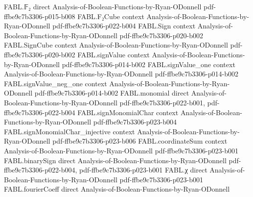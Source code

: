 \begin{theorem}
\label{FABL.averageComplexity_orFunction_eq}
\leanok
{}
\proofstep
  {FABL.𝔽₂}
  {direct}
  {Analysis-of-Boolean-Functions-by-Ryan-ODonnell}
  {pdf-ffbe9c7b3306-p015-b008}
\proofstep
  {FABL.F₂Cube}
  {context}
  {Analysis-of-Boolean-Functions-by-Ryan-ODonnell}
  {pdf-ffbe9c7b3306-p022-b004}
\proofstep
  {FABL.Sign}
  {context}
  {Analysis-of-Boolean-Functions-by-Ryan-ODonnell}
  {pdf-ffbe9c7b3306-p020-b002}
\proofstep
  {FABL.SignCube}
  {context}
  {Analysis-of-Boolean-Functions-by-Ryan-ODonnell}
  {pdf-ffbe9c7b3306-p020-b002}
\proofstep
  {FABL.signValue}
  {context}
  {Analysis-of-Boolean-Functions-by-Ryan-ODonnell}
  {pdf-ffbe9c7b3306-p014-b002}
\proofstep
  {FABL.signValue_one}
  {context}
  {Analysis-of-Boolean-Functions-by-Ryan-ODonnell}
  {pdf-ffbe9c7b3306-p014-b002}
\proofstep
  {FABL.signValue_neg_one}
  {context}
  {Analysis-of-Boolean-Functions-by-Ryan-ODonnell}
  {pdf-ffbe9c7b3306-p014-b002}
\proofstep
  {FABL.monomial}
  {direct}
  {Analysis-of-Boolean-Functions-by-Ryan-ODonnell}
  {pdf-ffbe9c7b3306-p022-b001,
    pdf-ffbe9c7b3306-p022-b004}
\proofstep
  {FABL.signMonomialChar}
  {context}
  {Analysis-of-Boolean-Functions-by-Ryan-ODonnell}
  {pdf-ffbe9c7b3306-p023-b004}
\proofstep
  {FABL.signMonomialChar_injective}
  {context}
  {Analysis-of-Boolean-Functions-by-Ryan-ODonnell}
  {pdf-ffbe9c7b3306-p023-b006}
\proofstep
  {FABL.coordinateSum}
  {context}
  {Analysis-of-Boolean-Functions-by-Ryan-ODonnell}
  {pdf-ffbe9c7b3306-p023-b001}
\proofstep
  {FABL.binarySign}
  {direct}
  {Analysis-of-Boolean-Functions-by-Ryan-ODonnell}
  {pdf-ffbe9c7b3306-p022-b004,
    pdf-ffbe9c7b3306-p023-b001}
\proofstep
  {FABL.χ}
  {direct}
  {Analysis-of-Boolean-Functions-by-Ryan-ODonnell}
  {pdf-ffbe9c7b3306-p023-b001}
\proofstep
  {FABL.fourierCoeff}
  {direct}
  {Analysis-of-Boolean-Functions-by-Ryan-ODonnell}

\end{theorem}
